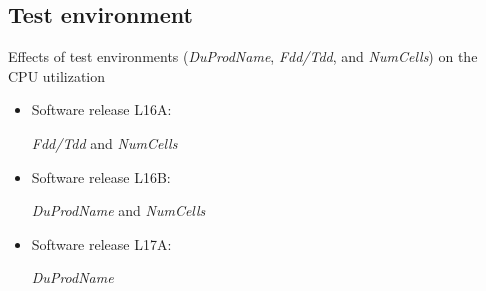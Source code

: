 \documentclass{beamer}
\begin{document}
\subsection{Test environment}
\begin{frame}[fragile]
Effects of test environments (\textit{DuProdName}, \textit{Fdd/Tdd}, and \textit{NumCells}) on the CPU utilization

\begin{itemize}
\item Software release L16A:

\textit{Fdd/Tdd} and \textit{NumCells}

\item Software release L16B:

\textit{DuProdName} and \textit{NumCells}

\item Software release L17A:

\textit{DuProdName} 

\end{itemize}

\end{frame}
\end{document}
